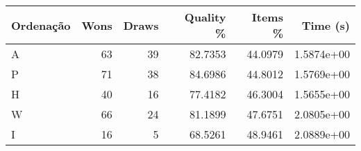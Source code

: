 \begin{tabular}{lrrrrr}
\hline
Ordenação & Wons & Draws & Quality \% & Items \% & Time (s)   \\
\hline
A         & 63   & 39    & 82.7353    & 44.0979  & 1.5874e+00 \\
P         & 71   & 38    & 84.6986    & 44.8012  & 1.5769e+00 \\
H         & 40   & 16    & 77.4182    & 46.3004  & 1.5655e+00 \\
W         & 66   & 24    & 81.1899    & 47.6751  & 2.0805e+00 \\
I         & 16   & 5     & 68.5261    & 48.9461  & 2.0889e+00 \\
\hline
\end{tabular}